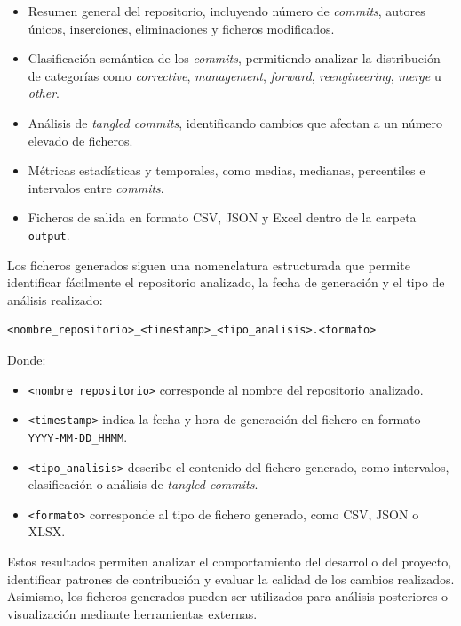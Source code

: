\documentclass[a4paper, 12pt]{book}
\begin{document}
\begin{itemize}
    \item Resumen general del repositorio, incluyendo número de \emph{commits}, autores únicos, inserciones, eliminaciones y ficheros modificados.
    
    \item Clasificación semántica de los \emph{commits}, permitiendo analizar la distribución de categorías como \emph{corrective}, \emph{management}, \emph{forward}, \emph{reengineering}, \emph{merge} u \emph{other}.
    
    \item Análisis de \emph{tangled commits}, identificando cambios que afectan a un número elevado de ficheros.
    
    \item Métricas estadísticas y temporales, como medias, medianas, percentiles e intervalos entre \emph{commits}.
    
    \item Ficheros de salida en formato CSV, JSON y Excel dentro de la carpeta \texttt{output}.
\end{itemize}

Los ficheros generados siguen una nomenclatura estructurada que permite identificar fácilmente el repositorio analizado, la fecha de generación y el tipo de análisis realizado:

\begin{verbatim}
<nombre_repositorio>_<timestamp>_<tipo_analisis>.<formato>
\end{verbatim}

Donde:

\begin{itemize}
    \item \texttt{<nombre\_repositorio>} corresponde al nombre del repositorio analizado.
    
    \item \texttt{<timestamp>} indica la fecha y hora de generación del fichero en formato \texttt{YYYY-MM-DD\_HHMM}.
    
    \item \texttt{<tipo\_analisis>} describe el contenido del fichero generado, como intervalos, clasificación o análisis de \emph{tangled commits}.
    
    \item \texttt{<formato>} corresponde al tipo de fichero generado, como CSV, JSON o XLSX.
\end{itemize}

Estos resultados permiten analizar el comportamiento del desarrollo del proyecto, identificar patrones de contribución y evaluar la calidad de los cambios realizados. Asimismo, los ficheros generados pueden ser utilizados para análisis posteriores o visualización mediante herramientas externas.
\end{document}

